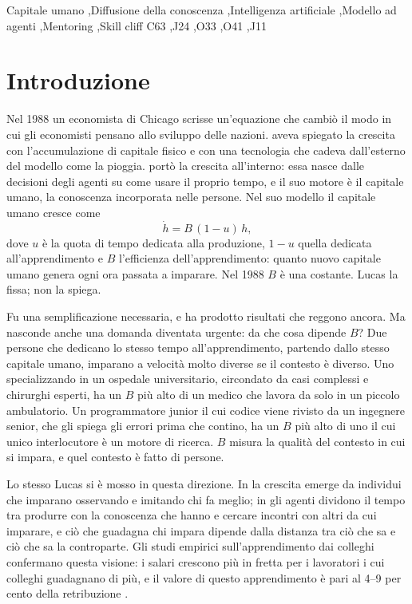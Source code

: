 \documentclass[preprint,12pt,authoryear]{elsarticle}
\begin{document}
\begin{frontmatter}
\begin{keyword}
Capitale umano \sep Diffusione della conoscenza \sep Intelligenza artificiale \sep Modello ad agenti \sep Mentoring \sep Skill cliff
\JEL C63 \sep J24 \sep O33 \sep O41 \sep J11
\end{keyword}

\end{frontmatter}

\section{Introduzione}

Nel 1988 un economista di Chicago scrisse un'equazione che cambiò il modo in cui gli economisti pensano allo sviluppo delle nazioni. \citet{Solow1956} aveva spiegato la crescita con l'accumulazione di capitale fisico e con una tecnologia che cadeva dall'esterno del modello come la pioggia. \citet{Lucas1988} portò la crescita all'interno: essa nasce dalle decisioni degli agenti su come usare il proprio tempo, e il suo motore è il capitale umano, la conoscenza incorporata nelle persone. Nel suo modello il capitale umano cresce come
\begin{equation}\label{eq:lucas}
\dot h = B\,(1-u)\,h,
\end{equation}
dove $u$ è la quota di tempo dedicata alla produzione, $1-u$ quella dedicata all'apprendimento e $B$ l'efficienza dell'apprendimento: quanto nuovo capitale umano genera ogni ora passata a imparare. Nel 1988 $B$ è una costante. Lucas la fissa; non la spiega.

Fu una semplificazione necessaria, e ha prodotto risultati che reggono ancora. Ma nasconde anche una domanda diventata urgente: da che cosa dipende $B$? Due persone che dedicano lo stesso tempo all'apprendimento, partendo dallo stesso capitale umano, imparano a velocità molto diverse se il contesto è diverso. Uno specializzando in un ospedale universitario, circondato da casi complessi e chirurghi esperti, ha un $B$ più alto di un medico che lavora da solo in un piccolo ambulatorio. Un programmatore junior il cui codice viene rivisto da un ingegnere senior, che gli spiega gli errori prima che contino, ha un $B$ più alto di uno il cui unico interlocutore è un motore di ricerca. $B$ misura la qualità del contesto in cui si impara, e quel contesto è fatto di persone.

Lo stesso Lucas si è mosso in questa direzione. In \citet{Lucas2009} la crescita emerge da individui che imparano osservando e imitando chi fa meglio; in \citet{LucasMoll2014} gli agenti dividono il tempo tra produrre con la conoscenza che hanno e cercare incontri con altri da cui imparare, e ciò che guadagna chi impara dipende dalla distanza tra ciò che sa e ciò che sa la controparte. Gli studi empirici sull'apprendimento dai colleghi confermano questa visione: i salari crescono più in fretta per i lavoratori i cui colleghi guadagnano di più, e il valore di questo apprendimento è pari al 4--9 per cento della retribuzione \citep{Jarosch2021,Herkenhoff2024}.
\end{document}
